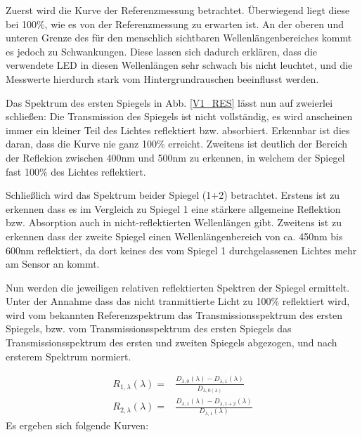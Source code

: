 Zuerst wird die Kurve der Referenzmessung betrachtet. Überwiegend liegt diese bei 100\%, wie es von der Referenzmessung zu erwarten ist. An der oberen und unteren Grenze des für den menschlich sichtbaren Wellenlängenbereiches kommt es jedoch zu Schwankungen. Diese lassen sich dadurch erklären, dass die verwendete LED in diesen Wellenlängen sehr schwach bis nicht leuchtet, und die Messwerte hierdurch stark vom Hintergrundrauschen beeinflusst werden. 

Das Spektrum des ersten Spiegels in Abb. \ref{V1_RES} lässt nun auf zweierlei schließen:
Die Transmission des Spiegels ist nicht vollständig, es wird anscheinen immer ein kleiner Teil des Lichtes reflektiert bzw. absorbiert. Erkennbar ist dies daran, dass die Kurve nie ganz 100\% erreicht. Zweitens ist deutlich der Bereich der Reflekion zwischen 400nm und 500nm zu erkennen, in welchem der Spiegel fast 100\% des Lichtes reflektiert. 

Schließlich wird das Spektrum beider Spiegel (1+2) betrachtet. Erstens ist zu erkennen dass es im Vergleich zu Spiegel 1 eine stärkere allgemeine Reflektion bzw. Absorption auch in nicht-reflektierten Wellenlängen gibt. Zweitens ist zu erkennen dass der zweite Spiegel einen Wellenlängenbereich von ca. 450nm bis 600nm reflektiert, da dort keines des vom Spiegel 1 durchgelassenen Lichtes mehr am Sensor an kommt.

Nun werden die jeweiligen relativen reflektierten Spektren der Spiegel ermittelt. Unter der Annahme dass das nicht tranmittierte Licht zu 100\% reflektiert wird, wird vom bekannten Referenzspektrum das Transmissionsspektrum des ersten Spiegels, bzw. vom Transmissionsspektrum des ersten Spiegels das Transmissionsspektrum des ersten und zweiten Spiegels abgezogen, und nach ersterem Spektrum normiert.

\begin{eqnarray}
	R_{1, \lambda}(\lambda) = & \frac{D_{\lambda,0}(\lambda) - D_{\lambda,1}(\lambda)}{D_{\lambda,0(\lambda)}} \\
	R_{2, \lambda}(\lambda) = & \frac{D_{\lambda,1}(\lambda) - D_{\lambda,1+2}(\lambda)}{D_{\lambda,1}(\lambda)}
\end{eqnarray}
Es ergeben sich folgende Kurven:

